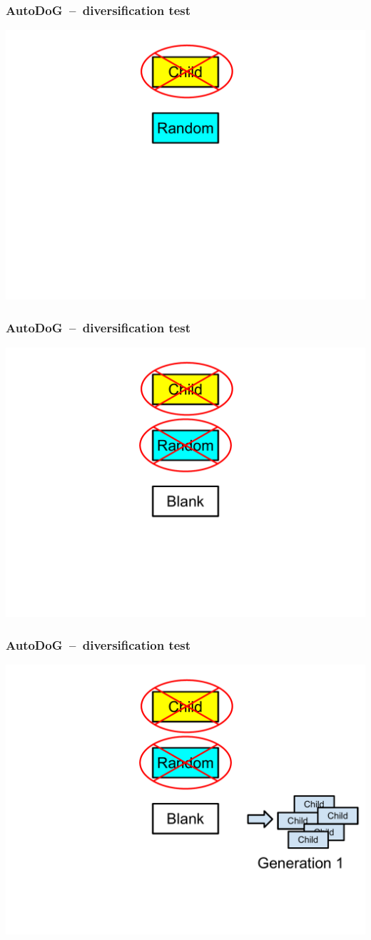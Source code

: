 \documentclass{beamer}
\begin{document}
\begin{frame}
	\frametitle{AutoDoG~--~diversification test}
	\includegraphics[width=.9\textwidth]{Illustrations/test_8.PDF}
\end{frame}

\begin{frame}
	\frametitle{AutoDoG~--~diversification test}
	\includegraphics[width=.9\textwidth]{Illustrations/test_9.PDF}
\end{frame}

\begin{frame}
	\frametitle{AutoDoG~--~diversification test}
	\includegraphics[width=.9\textwidth]{Illustrations/test_10.PDF}
\end{frame}
\end{document}
